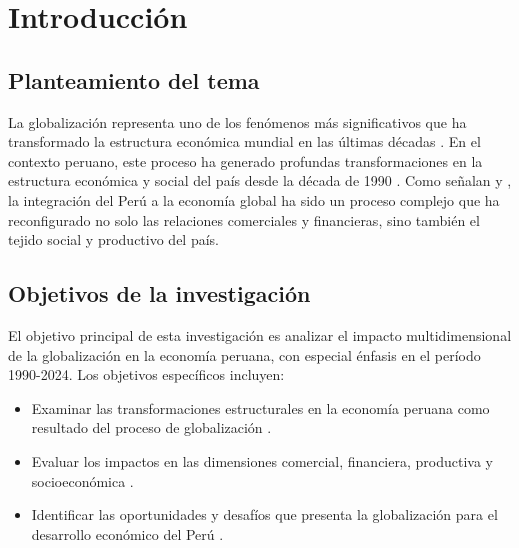 \documentclass[12pt, a4paper]{article}
\begin{document}

\tableofcontents
\newpage

\section{Introducción}

\subsection{Planteamiento del tema}
La globalización representa uno de los fenómenos más significativos que ha transformado la estructura económica mundial en las últimas décadas \parencite{stiglitz2002}. En el contexto peruano, este proceso ha generado profundas transformaciones en la estructura económica y social del país desde la década de 1990 \parencite{dancourt2016}. Como señalan \textcite{contreras2018} y \textcite{parodi2015}, la integración del Perú a la economía global ha sido un proceso complejo que ha reconfigurado no solo las relaciones comerciales y financieras, sino también el tejido social y productivo del país.

\subsection{Objetivos de la investigación}
El objetivo principal de esta investigación es analizar el impacto multidimensional de la globalización en la economía peruana, con especial énfasis en el período 1990-2024. Los objetivos específicos incluyen:

\begin{itemize}
    \item Examinar las transformaciones estructurales en la economía peruana como resultado del proceso de globalización \parencite{jimenez2017}.
    \item Evaluar los impactos en las dimensiones comercial, financiera, productiva y socioeconómica \parencite{yamada2019}.
    \item Identificar las oportunidades y desafíos que presenta la globalización para el desarrollo económico del Perú \parencite{garcia2019}.
\end{itemize}
\end{document}
